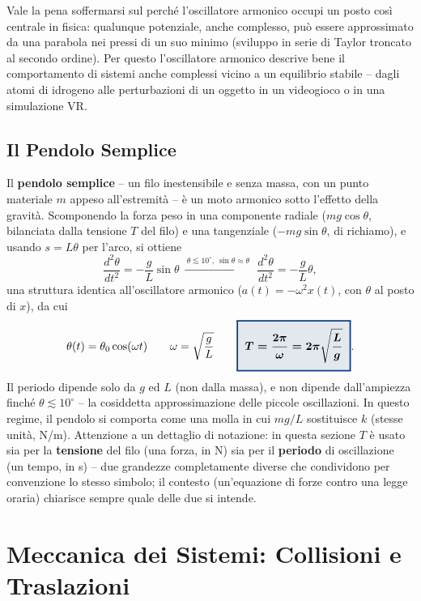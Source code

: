 \documentclass[a4paper,11pt]{article}
\newcommand{\keyeq}[1]{{\setlength{\fboxsep}{6pt}\setlength{\fboxrule}{1.3pt}\fcolorbox{chapblue}{chapblue!12}{\boldmath$\displaystyle #1$}}}
\begin{document}
Vale la pena soffermarsi sul perché l'oscillatore armonico occupi un posto così centrale in fisica: qualunque potenziale, anche complesso, può essere approssimato da una parabola nei pressi di un suo minimo (sviluppo in serie di Taylor troncato al secondo ordine). Per questo l'oscillatore armonico descrive bene il comportamento di sistemi anche complessi vicino a un equilibrio stabile -- dagli atomi di idrogeno alle perturbazioni di un oggetto in un videogioco o in una simulazione VR.

\subsection{Il Pendolo Semplice}

Il \textbf{pendolo semplice} -- un filo inestensibile e senza massa, con un punto materiale $m$ appeso all'estremità -- è un moto armonico sotto l'effetto della gravità. Scomponendo la forza peso in una componente radiale ($mg\cos\theta$, bilanciata dalla tensione $T$ del filo) e una tangenziale ($-mg\sin\theta$, di richiamo), e usando $s=L\theta$ per l'arco, si ottiene
\[
\frac{d^2\theta}{dt^2} = -\frac{g}{L}\sin\theta \ \xrightarrow{\ \theta\lesssim 10^{\circ},\ \sin\theta\approx\theta\ }\ \frac{d^2\theta}{dt^2} = -\frac{g}{L}\theta,
\]
una struttura identica all'oscillatore armonico ($a(t)=-\omega^2x(t)$, con $\theta$ al posto di $x$), da cui
\[
\theta(t) = \theta_0\cos(\omega t) \qquad \omega=\sqrt{\frac{g}{L}} \qquad \keyeq{T = \frac{2\pi}{\omega}=2\pi\sqrt{\frac{L}{g}}}.
\]
Il periodo dipende solo da $g$ ed $L$ (non dalla massa), e non dipende dall'ampiezza finché $\theta\lesssim10^{\circ}$ -- la cosiddetta approssimazione delle piccole oscillazioni. In questo regime, il pendolo si comporta come una molla in cui $mg/L$ sostituisce $k$ (stesse unità, N/m). Attenzione a un dettaglio di notazione: in questa sezione $T$ è usato sia per la \textbf{tensione} del filo (una forza, in N) sia per il \textbf{periodo} di oscillazione (un tempo, in s) -- due grandezze completamente diverse che condividono per convenzione lo stesso simbolo; il contesto (un'equazione di forze contro una legge oraria) chiarisce sempre quale delle due si intende.

\newpage
\section{Meccanica dei Sistemi: Collisioni e Traslazioni}
\end{document}
